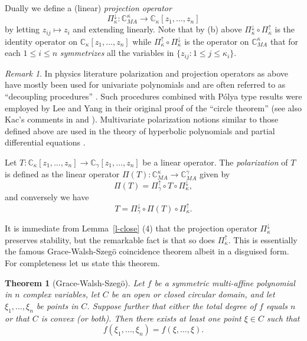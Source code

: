 \documentclass[10pt,reqno]{amsart}
\theoremstyle{plain}
\newtheorem{theorem}{Theorem}[section]
\theoremstyle{definition}
\theoremstyle{remark}
\newtheorem{remark}{Remark}[section]
\numberwithin{equation}{section}
\newcommand{\CC}{\mathbb{C}}
\newcommand{\CM}{\mathbb{C}_{ {MA}}}
\begin{document}
Dually we define a (linear) {\em projection operator} 
$$
\Pi_\kappa^\downarrow : \CM^\kappa \rightarrow  
\CC_\kappa[z_1, \ldots, z_n]
$$  
by letting $z_{ij} \mapsto z_i$ and extending linearly. Note that by (b) 
above $\Pi_\kappa^\downarrow \circ \Pi_\kappa^\uparrow$ is the identity 
operator 
on $\CC_\kappa[z_1, \ldots, z_n]$ while 
$\Pi_\kappa^\uparrow \circ \Pi_\kappa^\downarrow$ is the operator on 
$\CM^\kappa$ that 
for each $1 \leq i \leq n$ {\em symmetrizes} all the variables in 
$\{ z_{ij} : 1\leq j \leq \kappa_i\}$.

\begin{remark}\label{decoupling}
In physics literature polarization and projection operators as above 
have mostly been used for univariate polynomials and 
are often referred to as ``decoupling procedures'' \cite{beau,LY}. Such 
procedures combined with P\'olya type results \cite[Hilfssatz II]{pol-riem}
were employed by Lee and Yang in their original proof of 
the ``circle theorem'' \cite[Appendix II]{LY} (see also Kac's comments in
\cite[pp.~424--426]{pol-coll} and \cite[\S 9]{BB-II}). Multivariate 
polarization notions similar to 
those defined above are used in the 
theory of hyperbolic polynomials and partial differential equations 
\cite{garding,hor2,Lax}.
\end{remark}

Let  $T: \CC_\kappa[z_1,\ldots, z_n] \rightarrow  
\CC_\gamma [z_1,\ldots, z_n]$ be a linear 
operator. The {\em polarization} of $T$ is defined as the linear operator
$\Pi(T) : \CM^\kappa \rightarrow \CM^\gamma$ given by 
\begin{equation}\label{polop}
\Pi(T)= \Pi_\gamma^\uparrow \circ T\circ \Pi_\kappa^\downarrow, 
\end{equation}
and conversely we have 
\begin{equation}\label{poldown}
T= \Pi_\gamma^\downarrow \circ \Pi(T)\circ \Pi_\kappa^\uparrow. 
\end{equation}

It is immediate from Lemma~\ref{l-close} (4) that the projection operator 
$\Pi_\kappa^\downarrow$ preserves stability, but the remarkable fact is that 
so does  $\Pi_\kappa^\uparrow$. This is  essentially the famous 
Grace-Walsh-Szeg\"o coincidence theorem \cite{grace,szego,walsh} albeit in 
a disguised form. For completeness let us state this theorem. 

\begin{theorem}[Grace-Walsh-Szeg\"o]\label{GWS}
Let $f$ be a symmetric multi-affine polynomial in $n$ complex variables, 
let $C$ be an open or closed circular domain, and let $\xi_1, \ldots, \xi_n$ 
be points in $C$. Suppose further that either the total degree of $f$ equals 
$n$ or that $C$ is convex (or both). Then there exists at least one point 
$\xi \in C$ such that 
\begin{equation}\label{ssss}
f(\xi_1, \ldots, \xi_n)= f(\xi, \ldots, \xi). 
\end{equation}
\end{theorem}
\end{document}
